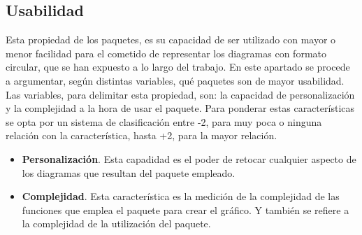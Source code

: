 \documentclass{article}\usepackage[]{graphicx}\usepackage[]{color}
\begin{document}
\subsection{Usabilidad}
Esta propiedad de los paquetes, es su capacidad de ser utilizado con mayor o menor facilidad para el cometido de representar los diagramas con formato circular, que se han expuesto a lo largo del trabajo. En este apartado se procede a argumentar, seg\'un distintas variables, qu\'e paquetes son de mayor usabilidad. Las variables, para delimitar esta propiedad, son: la capacidad de personalizaci\'on y la complejidad a la hora de usar el paquete.
Para ponderar estas caracter\'isticas se opta por un sistema de clasificaci\'on entre -2, para muy poca o ninguna relaci\'on con la caracter\'istica, hasta +2, para la mayor relaci\'on.
\begin{itemize}
\item \textbf{Personalizaci\'on}. Esta capadidad es el poder de retocar cualquier aspecto de los diagramas que resultan del paquete empleado.
\item \textbf{Complejidad}. Esta caracter\'istica es la medici\'on de la complejidad de las funciones que emplea el paquete para crear el gr\'afico. Y tambi\'en se refiere a la complejidad de la utilizaci\'on del paquete.
\end{itemize}
\end{document}

